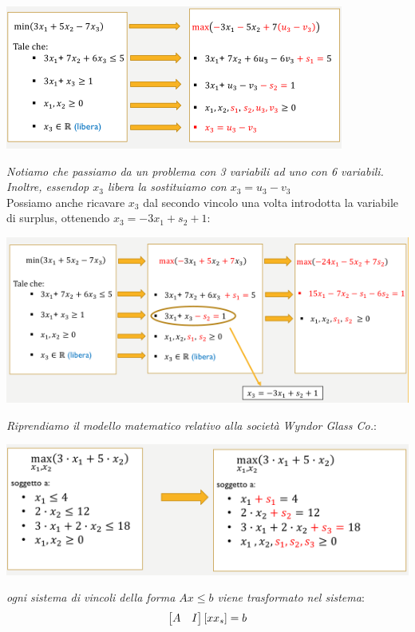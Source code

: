 \documentclass[a4paper,12pt, oneside]{book}
\begin{document}
\begin{esempio}
  \begin{center}
    \includegraphics[scale = 0.8]{img/sim2.png}
  \end{center}
  \textit{Notiamo che passiamo da un problema con 3 variabili ad uno
    con 6 variabili. Inoltre, essendop $x_3$ libera la sostituiamo
    con $x_3 = u_3-v_3$}\\
  Possiamo anche ricavare $x_3$ dal secondo vincolo una volta
  introdotta la variabile di surplus, ottenendo $x_3=-3x_1+s_2+1$:
  \begin{center}
    \includegraphics[scale = 0.8]{img/sim3.png}
  \end{center}
\end{esempio}
\begin{esempio}
  \textit{Riprendiamo il modello matematico relativo alla società
    Wyndor Glass Co.}:
  \begin{center}
    \includegraphics[scale = 0.8]{img/sim4.png}
  \end{center}
  \textit{ogni sistema di vincoli della forma $Ax \leq b$ viene
    trasformato nel sistema}:
  \[\left[
      \begin{matrix}
        A & I
      \end{matrix}
    \right]\left[
      x\\
      x_s
    \right]=b\]
\end{esempio}
\end{document}
